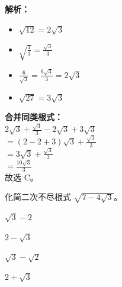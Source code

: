 \begin{solution}
    \textbf{解析：} \\
    {\Large
    \begin{itemize}
        \item $\displaystyle \sqrt{12} = 2\sqrt{3}$
        \item $\displaystyle \sqrt{\frac{1}{3}} = \frac{\sqrt{3}}{3}$
        \item $\displaystyle \frac{6}{\sqrt{3}} = \frac{6\sqrt{3}}{3} = 2\sqrt{3}$
        \item $\displaystyle \sqrt{27} = 3\sqrt{3}$
    \end{itemize}
    }
    \textbf{合并同类根式：} \\
    $\displaystyle 2\sqrt{3} + \frac{\sqrt{3}}{3} - 2\sqrt{3} + 3\sqrt{3}$ \\
    $\displaystyle = (2 - 2 + 3)\sqrt{3} + \frac{\sqrt{3}}{3}$ \\
    $\displaystyle = 3\sqrt{3} + \frac{\sqrt{3}}{3}$ \\
    $\displaystyle = \frac{10\sqrt{3}}{3}$ \\
    故选 C。
\end{solution}

\begin{question}
    化简二次不尽根式 $\displaystyle \sqrt{7 - 4\sqrt{3}}$。 \paren[B]
    \begin{choices}
        \item $\displaystyle \sqrt{3} - 2$ 
        \item $\displaystyle 2 - \sqrt{3}$ 
        \item $\displaystyle \sqrt{3} - \sqrt{2}$ 
        \item $\displaystyle 2 + \sqrt{3}$
    \end{choices}
\end{question}

